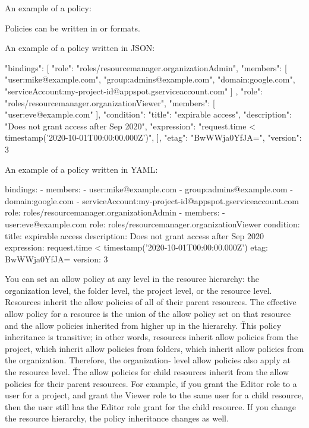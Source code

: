 \be
An example of a policy:
\ee

Policies can be written in  or  formats.

\be
An example of a policy written in JSON:
\begin{block}
{
  "bindings": [
    {
      "role": "roles/resourcemanager.organizationAdmin",
      "members": [
        "user:mike@example.com",
        "group:admins@example.com",
        "domain:google.com",
        "serviceAccount:my-project-id@appspot.gserviceaccount.com"
      ]
    },
    {
      "role": "roles/resourcemanager.organizationViewer",
      "members": [
        "user:eve@example.com"
      ],
      "condition": {
        "title": "expirable access",
        "description": "Does not grant access after Sep 2020",
        "expression": "request.time < timestamp('2020-10-01T00:00:00.000Z')",
      }
    }
  ],
  "etag": "BwWWja0YfJA=",
  "version": 3
}
\end{block}
\ee

\be
An example of a policy written in YAML:
\begin{block}
bindings:
- members:
  - user:mike@example.com
  - group:admins@example.com
  - domain:google.com
  - serviceAccount:my-project-id@appspot.gserviceaccount.com
  role: roles/resourcemanager.organizationAdmin
- members:
  - user:eve@example.com
  role: roles/resourcemanager.organizationViewer
  condition:
    title: expirable access
    description: Does not grant access after Sep 2020
    expression: request.time < timestamp('2020-10-01T00:00:00.000Z')
etag: BwWWja0YfJA=
version: 3
\end{block}
\ee

You can set an allow policy at any level in the resource hierarchy: the organization level, the folder level, the
project level, or the resource level. Resources inherit the allow policies of all of their parent resources. The
effective allow policy for a resource is the union of the allow policy set on that resource and the allow policies
inherited from higher up in the hierarchy. \v

This policy inheritance is transitive; in other words, resources inherit allow policies from the project, which
inherit allow policies from folders, which inherit allow policies from the organization. Therefore, the organization-
level allow policies also apply at the resource level. \v

The allow policies for child resources inherit from the allow policies for their parent resources. For example, if
you grant the Editor role to a user for a project, and grant the Viewer role to the same user for a child resource,
then the user still has the Editor role grant for the child resource. If you change the resource hierarchy, the
policy inheritance changes as well.

